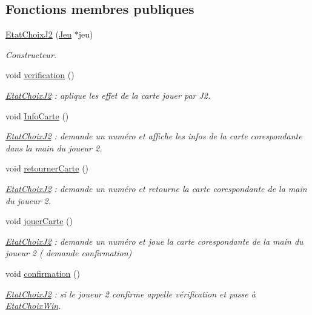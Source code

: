 \subsection*{Fonctions membres publiques}
\begin{DoxyCompactItemize}
\item 
\hyperlink{class_etat_choix_j2_a03b6c1b78ae155873b16335eaba68ea7}{Etat\-Choix\-J2} (\hyperlink{class_jeu}{Jeu} $\ast$jeu)
\begin{DoxyCompactList}\small\item\em Constructeur. \end{DoxyCompactList}\item 
void \hyperlink{class_etat_choix_j2_a93667fd195d816e8d3e8e26d16a86848}{verification} ()
\begin{DoxyCompactList}\small\item\em \hyperlink{class_etat_choix_j2}{Etat\-Choix\-J2} \-: aplique les effet de la carte jouer par J2. \end{DoxyCompactList}\item 
void \hyperlink{class_etat_choix_j2_ab0066e2aa95ddfe577d0e9ba4ae5441e}{Info\-Carte} ()
\begin{DoxyCompactList}\small\item\em \hyperlink{class_etat_choix_j2}{Etat\-Choix\-J2} \-: demande un numéro et affiche les infos de la carte corespondante dans la main du joueur 2. \end{DoxyCompactList}\item 
void \hyperlink{class_etat_choix_j2_a2fe8000154f582684c9a0162bb860b9f}{retourner\-Carte} ()
\begin{DoxyCompactList}\small\item\em \hyperlink{class_etat_choix_j2}{Etat\-Choix\-J2} \-: demande un numéro et retourne la carte corespondante de la main du joueur 2. \end{DoxyCompactList}\item 
void \hyperlink{class_etat_choix_j2_a674ef9e896f33d70cf8937b4591faae9}{jouer\-Carte} ()
\begin{DoxyCompactList}\small\item\em \hyperlink{class_etat_choix_j2}{Etat\-Choix\-J2} \-: demande un numéro et joue la carte corespondante de la main du joueur 2 ( demande confirmation) \end{DoxyCompactList}\item 
void \hyperlink{class_etat_choix_j2_af09ee4f38957e7fe8232db7dcfccd573}{confirmation} ()
\begin{DoxyCompactList}\small\item\em \hyperlink{class_etat_choix_j2}{Etat\-Choix\-J2} \-: si le joueur 2 confirme appelle vérification et passe à \hyperlink{class_etat_choix_win}{Etat\-Choix\-Win}. \end{DoxyCompactList}\item 

\end{DoxyCompactItemize}
